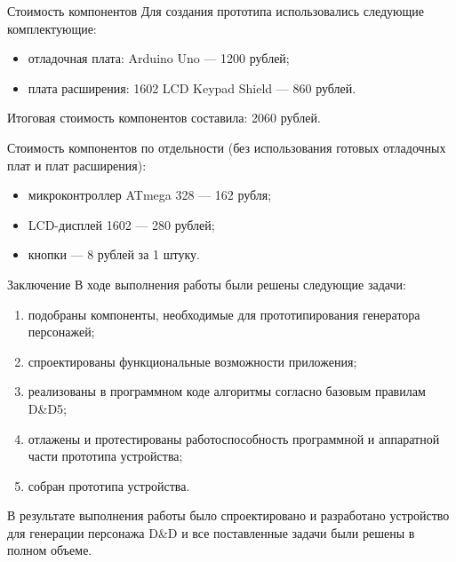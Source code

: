 \documentclass[12pt,a4paper,mathserif]{beamer}
\begin{document}
\begin{frame}{Стоимость компонентов}
    \setlength{\parindent}{0.5cm}
    Для создания прототипа использовались следующие комплектующие:
    \begin{itemize}
        \item отладочная плата: Arduino Uno --- 1200 рублей;
        \item плата расширения: 1602 LCD Keypad Shield --- 860 рублей.
    \end{itemize}

    Итоговая стоимость компонентов составила: 2060 рублей.

    Стоимость компонентов по отдельности (без использования готовых отладочных плат и плат расширения):

    \begin{itemize}
        \item микроконтроллер ATmega 328 --- 162 рубля;
        \item LCD-дисплей 1602 --- 280 рублей;
        \item кнопки --- 8 рублей за 1 штуку.
    \end{itemize}
\end{frame}

\begin{frame}{Заключение}
    \setlength{\parindent}{0.5cm}
    В ходе выполнения работы были решены следующие задачи:

    \begin{enumerate}
        \item подобраны компоненты, необходимые для прототипирования генератора персонажей;
        
        \item спроектированы функциональные возможности приложения;
        
        \item реализованы в программном коде алгоритмы согласно базовым правилам D\&D5;
        
        \item отлажены и протестированы работоспособность программной и аппаратной части прототипа устройства;
        
        \item собран прототипа устройства.
    \end{enumerate}
    
    В результате выполнения работы было спроектировано и разработано устройство для генерации персонажа D\&D и все поставленные задачи были решены в полном объеме.
\end{frame}
\end{document}
